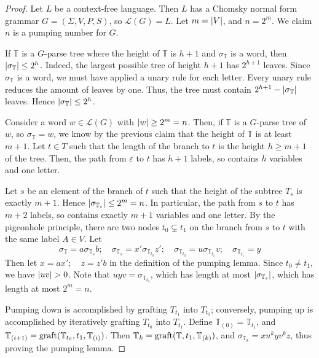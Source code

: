 \begin{proof}
	Let \( L \) be a context-free language.
	Then \( L \) has a Chomsky normal form grammar \( G = (\Sigma, V, P, S) \), so \( \mathcal L(G) = L \).
	Let \( m = \abs{V} \), and \( n = 2^m \).
	We claim \( n \) is a pumping number for \( G \).

	If \( \mathbb T \) is a \( G \)-parse tree where the height of \( \mathbb T \) is \( h + 1 \) and \( \sigma_{\mathbb T} \) is a word, then \( \abs{\sigma_{\mathbb T}} \leq 2^h \).
	Indeed, the largest possible tree of height \( h + 1 \) has \( 2^{h + 1} \) leaves.
	Since \( \sigma_{\mathbb T} \) is a word, we must have applied a unary rule for each letter.
	Every unary rule reduces the amount of leaves by one.
	Thus, the tree must contain \( 2^{h+1} - \abs{\sigma_{\mathbb T}} \) leaves.
	Hence \( \abs{\sigma_{\mathbb T}} \leq 2^h \).

	Consider a word \( w \in \mathcal L(G) \) with \( \abs{w} \geq 2^m = n \).
	Then, if \( \mathbb T \) is a \( G \)-parse tree of \( w \), so \( \sigma_{\mathbb T} = w \), we know by the previous claim that the height of \( \mathbb T \) is at least \( m + 1 \).
	Let \( t \in T \) such that the length of the branch to \( t \) is the height \( h \geq m + 1 \) of the tree.
	Then, the path from \( \varepsilon \) to \( t \) has \( h + 1 \) labels, so contains \( h \) variables and one letter.

	Let \( s \) be an element of the branch of \( t \) such that the height of the subtree \( T_s \) is exactly \( m + 1 \).
	Hence \( \abs{\sigma_{\mathbb T_s}} \leq 2^m = n \).
	In particular, the path from \( s \) to \( t \) has \( m + 2 \) labels, so contains exactly \( m + 1 \) variables and one letter.
	By the pigeonhole principle, there are two nodes \( t_0 \subsetneq t_1 \) on the branch from \( s \) to \( t \) with the same label \( A \in V \).
	Let
	\[ \sigma_{\mathbb T} = a\sigma_{\mathbb T_s} b;\quad \sigma_{\mathbb T_s} = x' \sigma_{\mathbb T_{t_0}} z';\quad \sigma_{\mathbb T_{t_0}} = u \sigma_{\mathbb T_{t_1}} v;\quad \sigma_{\mathbb T_{t_1}} = y \]
	Then let \( x = ax';\quad z = z'b \) in the definition of the pumping lemma.
	Since \( t_0 \neq t_1 \), we have \( \abs{uv} > 0 \).
	Note that \( uyv = \sigma_{\mathbb T_{t_0}} \), which has length at most \( \abs{\sigma_{\mathbb T_s}} \), which has length at most \( 2^m = n \).

	Pumping down is accomplished by grafting \( T_{t_1} \) into \( T_{t_0} \); conversely, pumping up is accomplished by iteratively grafting \( T_{t_0} \) into \( T_{t_1} \).
	Define \( \mathbb T_{(0)} = \mathbb T_{t_1} \), and \( \mathbb T_{(i+1)} = \operatorname{graft}(\mathbb T_{t_0}, t_1, \mathbb T_{(i)}) \).
	Then \( \mathbb T_k = \operatorname{graft}(\mathbb T, t_1, \mathbb T_{(k)}) \), and \( \sigma_{\mathbb T_k} = xu^kyv^kz \), thus proving the pumping lemma.
\end{proof}
